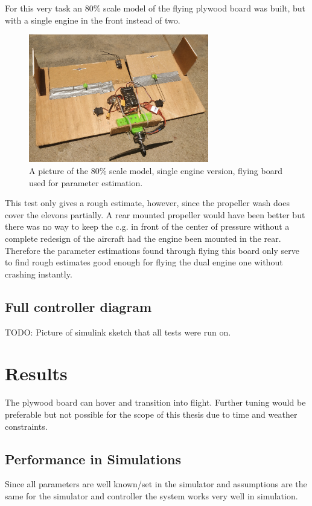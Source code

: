 \documentclass{article}
\begin{document}
For this very task an 80\% scale model of the flying plywood board was built, but with a single engine in the front instead of two.

\begin{figure}
    \center
    \includegraphics[width=0.7\textwidth]{singleengine.jpg}
    \caption{A picture of the 80\% scale model, single engine version, flying board used for parameter estimation.}
    \label{fig:singleengine}
\end{figure}

This test only gives a rough estimate, however, since the propeller wash does cover the elevons partially.
A rear mounted propeller would have been better but there was no way to keep the c.g. in front of the center of pressure without a complete redesign of the aircraft had the engine been mounted in the rear.
Therefore the parameter estimations found through flying this board only serve to find rough estimates good enough for flying the dual engine one without crashing instantly.

\subsection{Full controller diagram}
TODO: Picture of simulink sketch that all tests were run on.

\section{Results}

The plywood board can hover and transition into flight.
Further tuning would be preferable but not possible for the scope of this thesis due to time and weather constraints.

\subsection{Performance in Simulations}
Since all parameters are well known/set in the simulator and assumptions are the same for the simulator and controller the system works very well in simulation.
\end{document}
